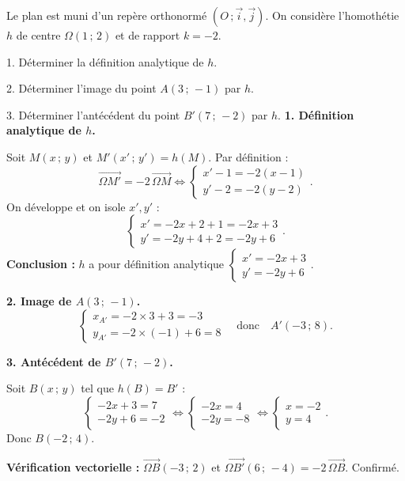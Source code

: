 \documentclass[11pt]{article}
\begin{document}
\begin{exoresolu}
Le plan est muni d'un repère orthonormé $(O\,;\vec{i},\vec{j})$. On considère l'homothétie $h$ de centre $\Omega(1\,;\,2)$ et de rapport $k = -2$.

1. Déterminer la définition analytique de $h$.

2. Déterminer l'image du point $A(3\,;\,-1)$ par $h$.

3. Déterminer l'antécédent du point $B'(7\,;\,-2)$ par $h$.
\tcblower
\textbf{1. Définition analytique de $h$.}

Soit $M(x\,;\,y)$ et $M'(x'\,;\,y') = h(M)$. Par définition :
\[ \overrightarrow{\Omega M'} = -2\,\overrightarrow{\Omega M} \iff \begin{cases} x' - 1 = -2(x - 1) \\ y' - 2 = -2(y - 2) \end{cases}. \]
On développe et on isole $x',y'$ :
\[ \begin{cases} x' = -2x + 2 + 1 = -2x + 3 \\ y' = -2y + 4 + 2 = -2y + 6 \end{cases}. \]
\textbf{Conclusion :} $h$ a pour définition analytique $\begin{cases} x' = -2x + 3 \\ y' = -2y + 6 \end{cases}$.

\textbf{2. Image de $A(3\,;\,-1)$.}
\[ \begin{cases} x_{A'} = -2 \times 3 + 3 = -3 \\ y_{A'} = -2 \times (-1) + 6 = 8 \end{cases} \quad \text{donc} \quad A'(-3\,;\,8). \]

\textbf{3. Antécédent de $B'(7\,;\,-2)$.}

Soit $B(x\,;\,y)$ tel que $h(B)=B'$ :
\[ \begin{cases} -2x + 3 = 7 \\ -2y + 6 = -2 \end{cases} \iff \begin{cases} -2x = 4 \\ -2y = -8 \end{cases} \iff \begin{cases} x = -2 \\ y = 4 \end{cases}. \]
Donc $B(-2\,;\,4)$.

\textbf{Vérification vectorielle :} $\overrightarrow{\Omega B}(-3\,;\,2)$ et $\overrightarrow{\Omega B'}(6\,;\,-4) = -2\,\overrightarrow{\Omega B}$. Confirmé.
\end{exoresolu}
\end{document}
